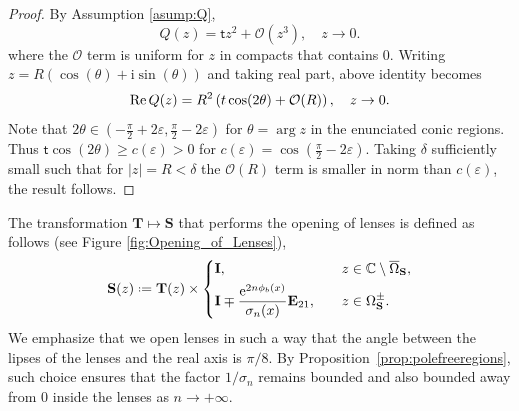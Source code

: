 \documentclass[reqno,a4paper,11pt]{amsart}
\DeclareMathOperator{\ee}{\rm e}
\renewcommand{\Re}{\mathop{\rm Re}}
\newcommand{\C}{\mathbb{C}}
\newcommand{\Boh}{\mathcal{O}}
\newcommand{\ii}{\mathrm{i}}
\renewcommand{\bm}{\mathbf}
\newcommand{\msf}{\mathsf}
\theoremstyle{definition}
\theoremstyle{remark}
\numberwithin{equation}{section}
\newcommand*{\defeq}{\mathrel{\vcenter{\baselineskip0.5ex \lineskiplimit0pt
                     \hbox{\scriptsize.}\hbox{\scriptsize.}}}%
                     =}
\begin{document}
\begin{proof}
    By Assumption \ref{asump:Q},
    \[
        Q(z) = \msf t z^2 + \Boh(z^3), \quad z \to 0.
    \]
    where the $\Boh$ term is uniform for $z$ in compacts that contains $0$. 
    Writing $z = R(\cos(\theta) + \ii \sin(\theta))$ and taking real part, above identity becomes
    \[
        \Re Q(z) = R^2 \left( t \cos(2 \theta) + \Boh(R) \right), \quad z \to 0.
    \]
    Note that $2 \theta \in \left(- \frac{\pi}{2} + 2 \varepsilon,  \frac{\pi}{2} - 2 \varepsilon \right)$ for $\theta = \arg z$ in the enunciated conic regions.  Thus $\msf t\cos (2\theta) \geq c(\varepsilon) > 0$ for $c(\varepsilon) = \cos \left( \frac{\pi}{2} - 2 \varepsilon\right)$. Taking $\delta$ sufficiently small such that for $|z| = R < \delta$ the $\Boh(R)$ term is smaller in norm than $c(\varepsilon)$, the result follows.
\end{proof}
        
The transformation $\bm T\mapsto \bm S$ that performs the opening of lenses is defined as follows (see Figure \ref{fig:Opening_of_Lenses}),
%
    \[
        \bm S(z) \defeq
            \bm T(z) \times
            \begin{dcases}
                \bm I, \quad &z \in \C \setminus \overline{\Omega}_{\bm S}, \\
                 \bm I \mp \frac{\ee^{2n\phi_b(x)}}{\sigma_n(x)} \bm E_{21}, \quad &z \in \Omega_{\bm S}^\pm.
            \end{dcases}
    \]
We emphasize that we open lenses in such a way that the angle between the lipses of the lenses and the real axis is $\pi/8$. By Proposition~\ref{prop:polefreeregions}, such choice ensures that the factor $1/\sigma_n$ remains bounded and also bounded away from $0$ inside the lenses as $n\to+\infty$.
\end{document}
